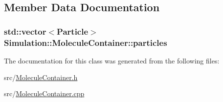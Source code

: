 \subsection{Member Data Documentation}
\hypertarget{classSimulation_1_1MoleculeContainer_a030dda8865bc9fed733c1b01e435e3a5}{
\subsubsection[{particles}]{\setlength{\rightskip}{0pt plus 5cm}std\-::vector$<${\bf Particle}$>$ Simulation\-::\-Molecule\-Container\-::particles\hspace{0.3cm}{\ttfamily [private]}}}\label{classSimulation_1_1MoleculeContainer_a030dda8865bc9fed733c1b01e435e3a5}


The documentation for this class was generated from the following files\-:\begin{DoxyCompactItemize}
\item 
src/\hyperlink{MoleculeContainer_8h}{Molecule\-Container.\-h}\item 
src/\hyperlink{MoleculeContainer_8cpp}{Molecule\-Container.\-cpp}\end{DoxyCompactItemize}
